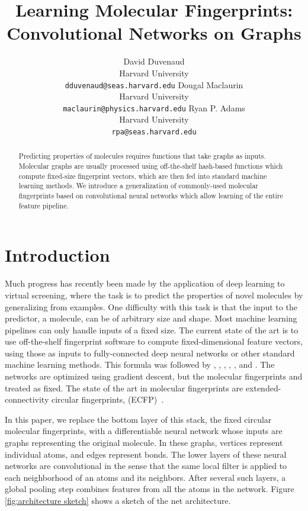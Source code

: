 \documentclass{article}
\title{Learning Molecular Fingerprints:\\Convolutional Networks on Graphs}
\author{
David Duvenaud\\
Harvard University\\
\texttt{dduvenaud@seas.harvard.edu}
\And
Dougal Maclaurin\\
Harvard University\\
\texttt{maclaurin@physics.harvard.edu}
\And
Ryan P. Adams\\
Harvard University\\
\texttt{rpa@seas.harvard.edu}
}
\begin{document}
\maketitle

\begin{abstract}
Predicting properties of molecules requires functions that take graphs as inputs.
Molecular graphs are usually processed using off-the-shelf hash-based functions which compute fixed-size fingerprint vectors, which are then fed into standard machine learning methods.
We introduce a generalization of commonly-used molecular fingerprints based on convolutional neural networks which allow learning of the entire feature pipeline.
\end{abstract}

\section{Introduction}

Much progress has recently been made by the application of deep learning to virtual screening, where the task is to predict the properties of novel molecules by generalizing from examples.
One difficulty with this task is that the input to the predictor, a molecule, can be of arbitrary size and shape.
Most machine learning pipelines can only handle inputs of a fixed size.
The current state of the art is to use off-the-shelf fingerprint software to compute fixed-dimensional feature vectors, using those as inputs to fully-connected deep neural networks or other standard machine learning methods.
This formula was followed by \citet{unterthinerdeep}, \citet{dahl2014multi}, \citet{tingley2014towards}, \citet{unterthiner2015toxicity},  \citet{ramsundar2015massively}, and \citet{ma_qsar_2015}.
The networks are optimized using gradient descent, but the molecular fingerprints and treated as fixed.
The state of the art in molecular fingerprints are extended-connectivity circular fingerprints, (ECFP)~\citep{ECFP2010}.%

In this paper, we replace the bottom layer of this stack, the fixed circular molecular fingerprints, with a differentiable neural network whose inputs are graphs representing the original molecule.
In these graphs, vertices represent individual atoms, and edges represent bonds.
The lower layers of these neural networks are convolutional in the sense that the same local filter is applied to each neighborhood of an atoms and its neighbors.
After several such layers, a global pooling step combines features from all the atoms in the network.
Figure \ref{fig:architecture sketch} shows a sketch of the net architecture.
\end{document}
